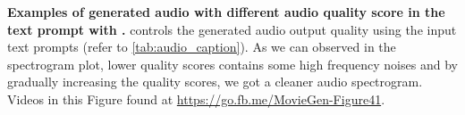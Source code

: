 \begin{table}[h]
    \vspace{-3mm}

    \caption{\textbf{Examples of generated audio with different audio quality score in the text prompt with \OursAudio.}
    \OursAudio controls the generated audio output quality using the input text prompts (refer to \ref{tab:audio_caption}). As we can observed in the spectrogram plot, lower quality scores contains some high frequency noises and by gradually increasing the quality scores, we got a cleaner audio spectrogram.
    Videos in this Figure found at \url{https://go.fb.me/MovieGen-Figure41}.
}
\label{fig:audio_ablation_audio_quality_sfx_music}
\end{table}
